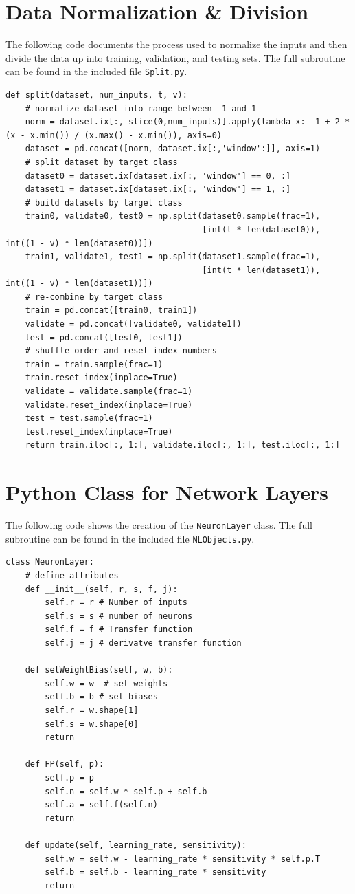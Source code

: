 \documentclass[12pt,halfline,a4paper]{ouparticle}
\begin{document}
\section{Data Normalization \& Division}
The following code documents the process used to normalize the inputs and then divide the data up into training, validation, and testing sets. The full subroutine can be found in the included file \verb|Split.py|.

\begin{lstlisting}[style = Python]
def split(dataset, num_inputs, t, v):
    # normalize dataset into range between -1 and 1
    norm = dataset.ix[:, slice(0,num_inputs)].apply(lambda x: -1 + 2 * (x - x.min()) / (x.max() - x.min()), axis=0)
    dataset = pd.concat([norm, dataset.ix[:,'window':]], axis=1)
    # split dataset by target class
    dataset0 = dataset.ix[dataset.ix[:, 'window'] == 0, :]
    dataset1 = dataset.ix[dataset.ix[:, 'window'] == 1, :]
    # build datasets by target class
    train0, validate0, test0 = np.split(dataset0.sample(frac=1),
                                        [int(t * len(dataset0)), int((1 - v) * len(dataset0))])
    train1, validate1, test1 = np.split(dataset1.sample(frac=1),
                                        [int(t * len(dataset1)), int((1 - v) * len(dataset1))])
    # re-combine by target class
    train = pd.concat([train0, train1])
    validate = pd.concat([validate0, validate1])
    test = pd.concat([test0, test1])
    # shuffle order and reset index numbers
    train = train.sample(frac=1)
    train.reset_index(inplace=True)
    validate = validate.sample(frac=1)
    validate.reset_index(inplace=True)
    test = test.sample(frac=1)
    test.reset_index(inplace=True)
    return train.iloc[:, 1:], validate.iloc[:, 1:], test.iloc[:, 1:]
\end{lstlisting} 
\pagebreak

\section{Python Class for Network Layers}
The following code shows the creation of the \verb|NeuronLayer| class. The full subroutine can be found in the included file \verb|NLObjects.py|.

\begin{lstlisting}[style = Python]
class NeuronLayer:
    # define attributes
    def __init__(self, r, s, f, j):
        self.r = r # Number of inputs
        self.s = s # number of neurons
        self.f = f # Transfer function
        self.j = j # derivatve transfer function

    def setWeightBias(self, w, b):
        self.w = w  # set weights
        self.b = b # set biases
        self.r = w.shape[1]
        self.s = w.shape[0]
        return

    def FP(self, p):
        self.p = p
        self.n = self.w * self.p + self.b
        self.a = self.f(self.n)
        return

    def update(self, learning_rate, sensitivity):
        self.w = self.w - learning_rate * sensitivity * self.p.T
        self.b = self.b - learning_rate * sensitivity
        return
\end{lstlisting} 
\pagebreak
\end{document}
